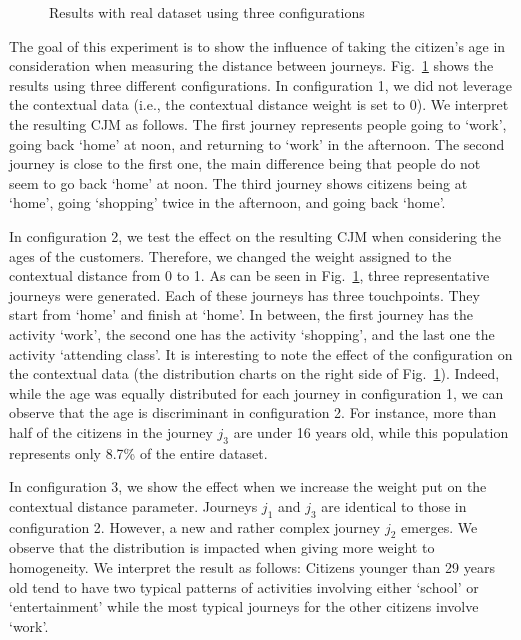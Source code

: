 \documentclass[runningheads]{llncs}
\begin{document}
{{{\begin{figure}[H]
\begin{center}
  \end{center}
  \caption{Results with real dataset using three configurations}
  \label{fig:results_real_dataset}
\end{figure}

The goal of this experiment is to show the influence of taking the citizen's age in consideration when measuring the distance between journeys. Fig.~\ref{fig:results_real_dataset} shows the results using three different configurations. In configuration 1, we did not leverage the contextual data (i.e., the contextual distance weight is set to 0). We interpret the resulting  CJM as follows. The first journey represents people going to `work', going back `home' at noon, and returning to `work' in the afternoon. The second journey is close to the first one, the main difference being that people do not seem to go back `home' at noon. The third journey shows citizens being at `home', going `shopping' twice in the afternoon, and going back `home'. 

In configuration 2, we test the effect on the resulting CJM when considering the ages of the customers. Therefore, we changed the weight assigned to the contextual distance from 0 to 1. As can be seen in Fig.~\ref{fig:results_real_dataset}, three representative journeys were generated. Each of these journeys has three touchpoints. They start from `home' and finish at `home'. In between, the first journey has the activity `work', the second one has the activity `shopping', and the last one the activity `attending class'. It is interesting to note the effect of the configuration on the contextual data (the distribution charts on the right side of Fig.~\ref{fig:results_real_dataset}). Indeed, while the age was equally distributed for each journey in configuration 1, we can observe that the age is discriminant in configuration 2. For instance, more than half of the citizens in the journey $j_3$ are under 16 years old, while this population represents only 8.7\% of the entire dataset.

In configuration 3, we show the effect when we increase the weight put on the contextual distance parameter. Journeys $j_1$ and $j_3$ are identical to those in configuration 2. However, a new and rather complex journey $j_2$ emerges. We observe that the distribution is impacted when giving more weight to homogeneity. We interpret the result as follows: Citizens younger than 29 years old tend to have two typical patterns of activities involving either `school' or `entertainment' while the most typical journeys for the other citizens involve `work'. 

}}}
\end{document}
